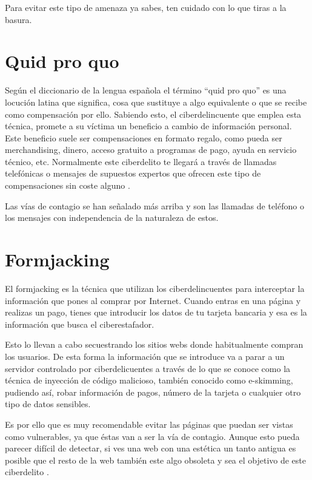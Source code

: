 \documentclass[
  a4paper,
  openany]{book}
\begin{document}
Para evitar este tipo de amenaza ya sabes, ten cuidado con lo que tiras a la basura.

\hypertarget{quid-pro-quo}{%
\section{Quid pro quo}\label{quid-pro-quo}}

Según el diccionario de la lengua española el término ``quid pro quo'' es una locución latina que significa, cosa que sustituye a algo equivalente o que se recibe como compensación por ello. Sabiendo esto, el ciberdelincuente que emplea esta técnica, promete a su víctima un beneficio a cambio de información personal. Este beneficio suele ser compensaciones en formato regalo, como pueda ser merchandising, dinero, acceso gratuito a programas de pago, ayuda en servicio técnico, etc. Normalmente este ciberdelito te llegará a través de llamadas telefónicas o mensajes de supuestos expertos que ofrecen este tipo de compensaciones sin coste alguno \citep{quid-pro-quo}.

Las vías de contagio se han señalado más arriba y son las llamadas de teléfono o los mensajes con independencia de la naturaleza de estos.

\hypertarget{formjacking}{%
\section{Formjacking}\label{formjacking}}

El formjacking es la técnica que utilizan los ciberdelincuentes para interceptar la información que pones al comprar por Internet. Cuando entras en una página y realizas un pago, tienes que introducir los datos de tu tarjeta bancaria y esa es la información que busca el ciberestafador.

Esto lo llevan a cabo secuestrando los sitios webs donde habitualmente compran los usuarios. De esta forma la información que se introduce va a parar a un servidor controlado por ciberdelicuentes a través de lo que se conoce como la técnica de inyección de código malicioso, también conocido como e-skimming, pudiendo así, robar información de pagos, número de la tarjeta o cualquier otro tipo de datos sensibles.

Es por ello que es muy recomendable evitar las páginas que puedan ser vistas como vulnerables, ya que éstas van a ser la vía de contagio. Aunque esto pueda parecer difícil de detectar, si ves una web con una estética un tanto antigua es posible que el resto de la web también este algo obsoleta y sea el objetivo de este ciberdelito \citep{RZ-formjacking}.
\end{document}

